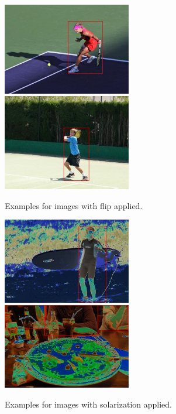 \documentclass[
    headings=optiontohead,              %
    12pt,                               %
    DIV=13,                             %
    twoside=false,                      %
    open=right,                         %
    BCOR=00mm,                          %
    toc=bibliographynumbered,            %
    parskip=half,                       %
]{scrarticle}
\begin{document}
    \begin{figure}[htpb]
        \centering
        \includegraphics[width=0.5\textwidth]{../00011129.jpg}
        \includegraphics[width=0.5\textwidth]{../00001527.jpg}
        \caption{Examples for images with flip applied.}
        \label{fig:7.1_flip}
    \end{figure}
    \begin{figure}[htpb]
        \centering
        \includegraphics[width=0.5\textwidth]{../00016099.jpg}
        \includegraphics[width=0.5\textwidth]{../00015219.jpg}
        \caption{Examples for images with solarization applied.}
        \label{fig:7.1_solarize}
    \end{figure}
\end{document}
